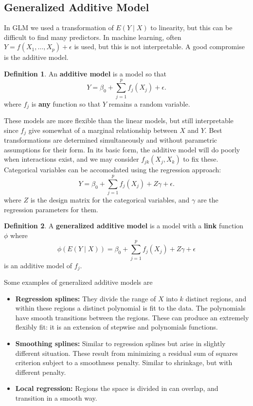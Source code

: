 \documentclass[12pt, a4paper]{article}
\theoremstyle{definition}
\newtheorem{definition}{Definition}
\newcommand{\eps}{\epsilon}
\begin{document}
	\subsection{Generalized Additive Model}
	
	In GLM we used a transformation of $E(Y \mid X)$ to linearity, but this can be difficult to find many predictors. In machine learning, often $Y = f(X_1, \ldots, X_p) + \eps$ is used, but this is not interpretable. A good compromise is the additive model.
	\begin{definition}
		An {\bf additive model} is a model so that 
		$$
			Y = \beta_0 + \sum_{j=1}^p f_j(X_j) + \eps.
		$$
		where $f_j$ is {\bf any} function so that $Y$ remains a random variable. 
	\end{definition}
	These models are more flexible than the linear models, but still interpretable since $f_j$ give somewhat of a marginal relationship between $X$ and $Y$. Best transformations are determined simultaneously and without parametric assumptions for their form.
	In its basic form, the additive model will do poorly when interactions exist, and we may consider $f_{jk}(X_j, X_k)$ to fix these. Categorical variables can be accomodated using the regression approach:
	$$
	Y = \beta_0 + \sum_{j=1}^p f_j(X_j) + Z\gamma + \eps.
	$$
	where $Z$ is the design matrix for the categorical variables, and $\gamma$ are the regression parameters for them.
	
	\begin{definition}
		A {\bf generalized additive model} is a model with a {\bf link} function $\phi$ where 
		$$\phi(E(Y \mid X)) = \beta_0 + \sum_{j=1}^p f_j(X_j) + Z\gamma + \eps$$ 
		is an additive model of $f_j$.
	\end{definition}

	Some examples of generalized additive models are
	\begin{itemize}
		\item {\bf Regression splines:} They divide the range of $X$ into $k$ distinct regions, and within these regions a distinct polynomial is fit to the data. The polynomials have smooth transitions between the regions. These can produce an extremely flexibly fit: it is an extension of stepwise and polynomials functions.
		\item {\bf Smoothing splines:} Similar to regression splines but arise in slightly different situation. These result from minimizing a residual sum of squares criterion subject to a smoothness penalty. Similar to shrinkage, but with different penalty.
		\item {\bf Local regression:} Regions the space is divided in can overlap, and transition in a smooth way.
	\end{itemize}
\end{document}
